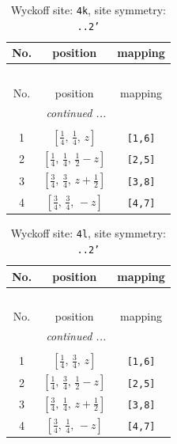 \documentclass[fleqn,8pt]{jsarticle}
\begin{document}
\renewcommand{\arraystretch}{1.2}
\begin{longtable}{ccc}
\caption{Wyckoff site: {\tt 4k}, site symmetry: {\tt ..2'}}
 \\
 \hline \hline
No. & position & mapping \\ \hline \endfirsthead

\multicolumn{2}{l}{\tablename\ \thetable{}} \\
 \hline \hline
No. & position & mapping \\ \hline \endhead

 \hline \hline
\multicolumn{2}{r}{\footnotesize\it continued ...} \\ \endfoot

 \hline \hline
\multicolumn{2}{r}{} \\ \endlastfoot

1 & $\left[ \frac{1}{4},\, \frac{1}{4},\, z \right]$ & {\tt [1,6]} \\ \hline
2 & $\left[ \frac{1}{4},\, \frac{1}{4},\, \frac{1}{2} - z \right]$ & {\tt [2,5]} \\ \hline
3 & $\left[ \frac{3}{4},\, \frac{3}{4},\, z + \frac{1}{2} \right]$ & {\tt [3,8]} \\ \hline
4 & $\left[ \frac{3}{4},\, \frac{3}{4},\, - z \right]$ & {\tt [4,7]} \\
\end{longtable}
\renewcommand{\arraystretch}{1.2}
\begin{longtable}{ccc}
\caption{Wyckoff site: {\tt 4l}, site symmetry: {\tt ..2'}}
 \\
 \hline \hline
No. & position & mapping \\ \hline \endfirsthead

\multicolumn{2}{l}{\tablename\ \thetable{}} \\
 \hline \hline
No. & position & mapping \\ \hline \endhead

 \hline \hline
\multicolumn{2}{r}{\footnotesize\it continued ...} \\ \endfoot

 \hline \hline
\multicolumn{2}{r}{} \\ \endlastfoot

1 & $\left[ \frac{1}{4},\, \frac{3}{4},\, z \right]$ & {\tt [1,6]} \\ \hline
2 & $\left[ \frac{1}{4},\, \frac{3}{4},\, \frac{1}{2} - z \right]$ & {\tt [2,5]} \\ \hline
3 & $\left[ \frac{3}{4},\, \frac{1}{4},\, z + \frac{1}{2} \right]$ & {\tt [3,8]} \\ \hline
4 & $\left[ \frac{3}{4},\, \frac{1}{4},\, - z \right]$ & {\tt [4,7]} \\
\end{longtable}
\end{document}
